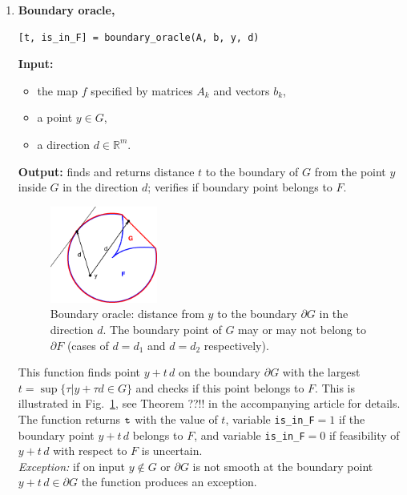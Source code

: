 \documentclass[a4paper]{article}
\newcommand{\R}{\mathbb{R}}
\theoremstyle{definition}
\begin{document}
\begin{enumerate}
The function returns {\tt is\_infeasible}$=1$ if the desired hyperplane was found.
In this case $y\notin G$ and consequently $y\notin F$, implying there is no $x\in \mathbb{V}$ such that $y=f(x)$, i.e.~this point is infeasible.
If the hyperplane was not found the function returns {\tt is\_infeasible}$=0$, which means the feasibility  of $y$ with respect to $F$ is uncertain.

We note that feasibility of $y$  is exactly the same as solvability of the system of quadratic equations $y=f(x)$ with real-valued $x$ when the map $f$ is real, or with $x$ and $x^*$ being complex conjugate to each other if $f$ is complex as defined in eq.~\eqref{complex}.

\item {\bf Boundary oracle,\hskip 6pt}
\begin{verbatim}
[t, is_in_F] = boundary_oracle(A, b, y, d)
\end{verbatim}
{\bf Input:}
\begin{itemize}
	\item the map $f$ specified by matrices $A_k$ and vectors $b_k$,
	\item a point $y\in G$,
	\item a direction $d\in\R^m$.
\end{itemize}
{\bf Output:}  finds and returns distance $t$ to the boundary of $G$ from the point $y$ inside $G$ in the direction $d$; verifies if boundary point belongs to $F$. 


\begin{figure}[H]
	\centering\includegraphics[width=100pt]{fig/boundary_oracle}
	\caption{Boundary oracle: distance from $y$ to the boundary $\partial G$ in the direction $d$. The boundary point of $G$ may or may not belong to $\partial F$ (cases of $d=d_1$ and $d=d_2$ respectively).}
\label{fig:two}
\end{figure}


This function finds point $y+t\,d$ on the boundary $\partial G$ with the largest $ {t} = \sup\{\tau\big| y+\tau d\in G\}$ and checks if this point belongs to $F$. 
This is illustrated in Fig.~\ref{fig:two}, see Theorem ??!! in the accompanying article for details. The function returns $\tt t$ with the value of $t$, variable
	{\tt  is\_in\_F}$=1$ if the boundary point $y+t\,d$ belongs to $F$, and variable {\tt  is\_in\_F}$=0$ if feasibility of $y+t\,d$ with respect to $F$ is uncertain.\\
{\it Exception:}  if on input $y\notin G$ or $\partial G$ is not smooth at the boundary point $y+t\,d\in \partial G$ the function produces an exception. 




\end{enumerate}
\end{document}
